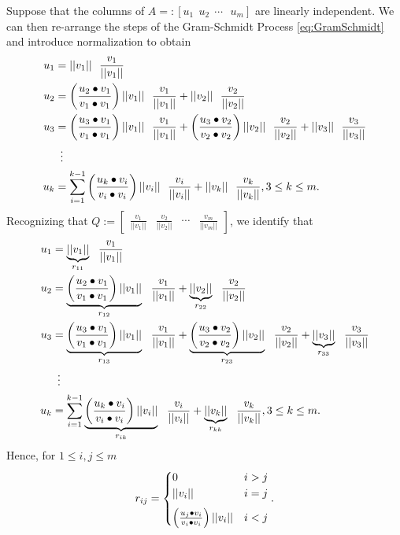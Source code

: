 \begin{tcolorbox}[sharp corners, colback=green!30, colframe=green!80!blue, title=\textbf{\Large More Efficient QR Factorization by Reading R Directly from Gram-Schmidt}]
Suppose that the columns of $A=:\left[ u_1~~ u_2~~\cdots~~~ u_m\right]$ are linearly independent. We can then re-arrange the steps of the Gram-Schmidt Process \eqref{eq:GramSchmidt} and introduce normalization to obtain 
 \begin{equation}
 \label{eq:GramSchmidtRCoefficients}
 \begin{aligned}
 u_1 & =||v_1||~~ \frac{v_1}{||v_1||} \\
 u_2 &=  \left(\frac{u_2 \bullet v_1}{v_1 \bullet v_1}\right) ||v_1|| ~~ \frac{v_1}{||v_1||} + ||v_2|| ~~\frac{v_2}{||v_2||} \bigskip \\
 u_3 &= \left(\frac{u_3 \bullet v_1}{v_1 \bullet v_1}\right) ||v_1|| ~~ \frac{v_1}{||v_1||} + \left(\frac{u_3 \bullet v_2}{v_2 \bullet v_2}\right)||v_2|| ~~\frac{v_2}{||v_2||} + ||v_3||~~ \frac{v_3}{||v_3||} \\
 & ~\vdots \\
	u_k &=  \sum_{i=1}^{k-1} \left(\frac{u_k \bullet v_i}{v_i \bullet v_i}\right) ||v_i||~~ \frac{v_i}{||v_i||} + ||v_k||~~ \frac{v_k}{||v_k||}, 3 \le k \le m.
	\end{aligned}
\end{equation}
Recognizing that $Q:=\left[ \begin{array}{cccc} \frac{v_1}{||v_1||} & \frac{v_2}{||v_2||} & \cdots& \frac{v_m}{||v_m||} \end{array} \right]$, we  identify that
 \begin{equation}
 \label{eq:GramSchmidtRCoefficients02}
 \begin{aligned}
 u_1 & =\underbrace{||v_1||}_{r_{11}} ~~ \frac{v_1}{||v_1||} \\
 u_2 &=  \underbrace{\left(\frac{u_2 \bullet v_1}{v_1 \bullet v_1}\right) ||v_1||}_{r_{12}} ~~\frac{v_1}{||v_1||} + \underbrace{||v_2||}_{r_{22}} ~~ \frac{v_2}{||v_2||} \bigskip \\
 u_3 &= \underbrace{\left(\frac{u_3 \bullet v_1}{v_1 \bullet v_1}\right) ||v_1||}_{r_{13}}~~ \frac{v_1}{||v_1||} + \underbrace{\left(\frac{u_3 \bullet v_2}{v_2 \bullet v_2}\right)||v_2||}_{r_{23} } ~~\frac{v_2}{||v_2||} + \underbrace{||v_3||}_{r_{33}}~~ \frac{v_3}{||v_3||} \\
 & ~\vdots \\
	u_k &= \sum_{i=1}^{k-1} \underbrace{ \left(\frac{u_k \bullet v_i}{v_i \bullet v_i}\right) ||v_i||}_{r_{ik}} ~~ \frac{v_i}{||v_i||} + \underbrace{||v_k||}_{r_{kk}} ~~ \frac{v_k}{||v_k||}, 3 \le k \le m.
	\end{aligned}
\end{equation}
Hence, for $1 \le i, j \le m$
$$r_{ij}=\begin{cases} 0 & i > j \\ ||v_i|| & i = j \medskip \\  \left(\frac{u_j \bullet v_i}{v_i \bullet v_i}\right) ||v_i|| & i < j \end{cases}. $$
\end{tcolorbox}


